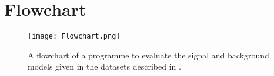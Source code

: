 \chapter{Flowchart}\label{cha:flowchart}
\begin{figure}[h]
 \centering
\texttt{[image: Flowchart.png]}
  \caption{A flowchart of a programme to evaluate the signal and background models given in the datasets described in .}
    \label{fig:flowchart}
\end{figure}